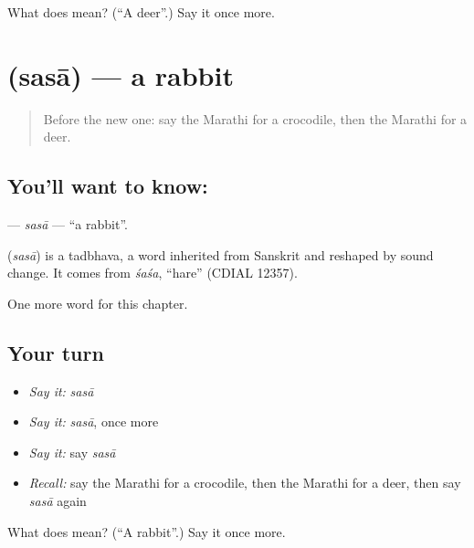 \begin{tcolorbox}[breakable,colback=teal!4,colframe=teal!35!black,title={Before you move on}]
What does  mean? (\textquotedblleft{}A deer\textquotedblright{}.) Say it once more.
\end{tcolorbox}
\section[\texorpdfstring{\mr{ससा} (sasā)}{ससा (sasā)}]{ (sasā) — a rabbit}

\label{lesson:MR-C143-sasa}



\begin{quote}
Before the new one: say the Marathi for a crocodile, then the Marathi for a deer.
\end{quote}

\subsection*{You'll want to know: }
\textbf{} — \emph{sasā} — \textquotedblleft{}a rabbit\textquotedblright{}.

\begin{cousinweb}
\textbf{} (\emph{sasā}) is a tadbhava, a word inherited from Sanskrit and reshaped by sound change. It comes from \emph{śaśa}, \textquotedblleft{}hare\textquotedblright{} (CDIAL 12357).
\end{cousinweb}

\begin{grammarlens}[title={What you've built}]
One more word for this chapter.
\end{grammarlens}

\subsection*{Your turn}
\begin{itemize}
\raggedright
  \item \emph{Say it:} \emph{sasā}
  \item \emph{Say it:} \emph{sasā}, once more
  \item \emph{Say it:} say \emph{sasā}
  \item \emph{Recall:} say the Marathi for a crocodile, then the Marathi for a deer, then say \emph{sasā} again
\end{itemize}

\begin{tcolorbox}[breakable,colback=teal!4,colframe=teal!35!black,title={Before you move on}]
What does  mean? (\textquotedblleft{}A rabbit\textquotedblright{}.) Say it once more.
\end{tcolorbox}
